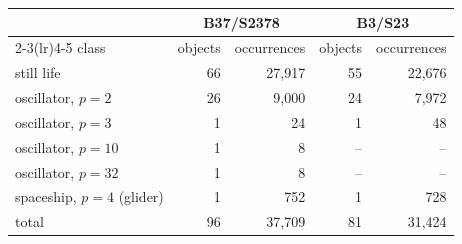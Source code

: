 \begin{tabular}{lrrrr}
\toprule
 & \multicolumn{2}{c}{B37/S2378} & \multicolumn{2}{c}{B3/S23} \\
\cmidrule(lr){2-3}\cmidrule(lr){4-5}
class & objects & occurrences & objects & occurrences \\
\midrule
still life & 66 & 27{,}917 & 55 & 22{,}676 \\
oscillator, $p=2$ & 26 & 9{,}000 & 24 & 7{,}972 \\
oscillator, $p=3$ & 1 & 24 & 1 & 48 \\
oscillator, $p=10$ & 1 & 8 & -- & -- \\
oscillator, $p=32$ & 1 & 8 & -- & -- \\
spaceship, $p=4$ (glider) & 1 & 752 & 1 & 728 \\
\midrule
total & 96 & 37{,}709 & 81 & 31{,}424 \\
\bottomrule
\end{tabular}
